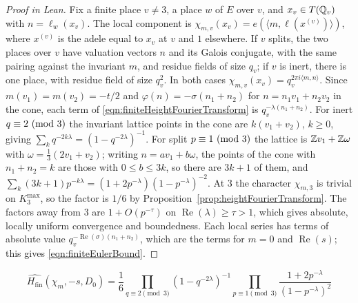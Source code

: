 \begin{proof}[Proof in Lean]

\leanok


Fix a finite place $v\neq3$, a place $w$ of $E$ over $v$, and $x_v\in T(\mathbb{Q}_v)$ with $n=\ell_w(x_v)$. The local component is $\chi_{m,v}(x_v)=e(\langle m,\ell(x^{(v)})\rangle)$, where $x^{(v)}$ is the adele equal to $x_v$ at $v$ and $1$ elsewhere. If $v$ splits, the two places over $v$ have valuation vectors $n$ and its Galois conjugate, with the same pairing against the invariant $m$, and residue fields of size $q_v$; if $v$ is inert, there is one place, with residue field of size $q_v^2$. In both cases $\chi_{m,v}(x_v)=q_v^{2\pi i\langle m,n\rangle}$. Since $m(v_1)=m(v_2)=-t/2$ and $\varphi(n)=-\sigma(n_1+n_2)$ for $n=n_1v_1+n_2v_2$ in the cone, each term of \eqref{eqn:finiteHeightFourierTransform} is $q_v^{-\lambda(n_1+n_2)}$. For inert $q\equiv2\ (\mathrm{mod}\ 3)$ the invariant lattice points in the cone are $k(v_1+v_2)$, $k\geq0$, giving $\sum_kq^{-2k\lambda}=(1-q^{-2\lambda})^{-1}$. For split $p\equiv1\ (\mathrm{mod}\ 3)$ the lattice is $\mathbb{Z} v_1+\mathbb{Z}\omega$ with $\omega=\tfrac13(2v_1+v_2)$; writing $n=av_1+b\omega$, the points of the cone with $n_1+n_2=k$ are those with $0\leq b\leq3k$, so there are $3k+1$ of them, and $\sum_k(3k+1)p^{-k\lambda}=(1+2p^{-\lambda})(1-p^{-\lambda})^{-2}$. At $3$ the character $\chi_{m,3}$ is trivial on $K_3^{\mathrm{max}}$, so the factor is $1/6$ by Proposition~\ref{prop:heightFourierTransform}. The factors away from $3$ are $1+O(p^{-\tau})$ on $\operatorname{Re}(\lambda)\geq\tau>1$, which gives absolute, locally uniform convergence and boundedness. Each local series has terms of absolute value $q_v^{-\operatorname{Re}(\sigma)(n_1+n_2)}$, which are the terms for $m=0$ and $\operatorname{Re}(s)$; this gives \eqref{eqn:finiteEulerBound}.

\end{proof}

\begin{equationnode}

\label{eqn:finiteSpectralProduct}


\leanok



\begin{equation*} \widehat{H_{\mathrm{fin}}}(\chi_m,-s,D_0) =\frac16 \prod_{q\equiv2\pmod3}(1-q^{-2\lambda})^{-1} \prod_{p\equiv1\pmod3} \frac{1+2p^{-\lambda}}{(1-p^{-\lambda})^2} \end{equation*}

\end{equationnode}

